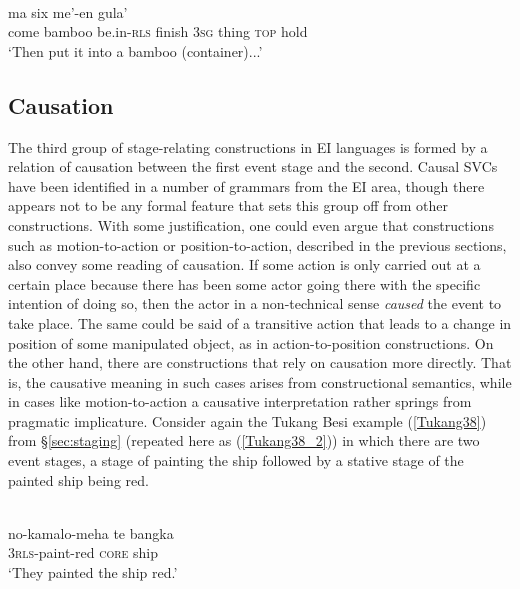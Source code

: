 \ea \label{Teiwa_xy}
\\
\gll ma six me'-en gula' \\
come bamboo be.in-\textsc{rls} finish 3\textsc{sg} thing \textsc{top} hold \\
\glft `Then put it into a bamboo (container)...'\\ 
\z

\subsection{Causation} \label{sec:causation}

The third group of stage-relating constructions in EI languages is formed by a relation of causation between the first event stage and the second. Causal SVCs have been identified in a number of grammars from the EI area, though there appears not to be any formal feature that sets this group off from other constructions. With some justification, one could even argue that constructions such as motion-to-action or position-to-action, described in the previous sections, also convey some reading of causation. If some action is only carried out at a certain place because there has been some actor going there with the specific intention of doing so, then the actor in a non-technical sense \textit{caused} the event to take place. The same could be said of a transitive action that leads to a change in position of some manipulated object, as in action-to-position constructions. On the other hand, there are constructions that rely on causation more directly. That is, the causative  meaning in such cases arises from constructional semantics, while in cases like motion-to-action a causative interpretation rather springs from pragmatic implicature. Consider again the Tukang Besi example (\ref{Tukang38}) from §\ref{sec:staging} (repeated here as (\ref{Tukang38_2})) in which there are two event stages, a stage of painting the ship followed by a stative stage of the painted ship being red.

\ea \label{Tukang38_2}
\\
\gll no-kamalo-meha te bangka \\
3\textsc{rls}-paint-red \textsc{core} ship \\
\glft `They painted the ship red.'\\ 
\z

